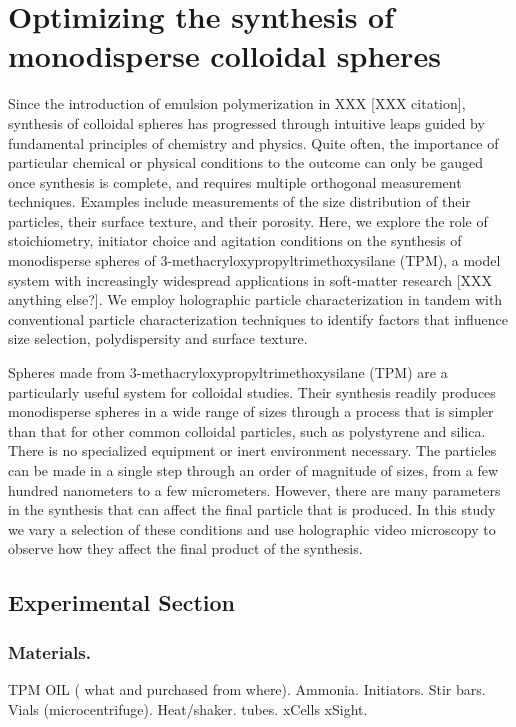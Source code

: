 \chapter{Optimizing the synthesis of monodisperse colloidal spheres}
\label{ch:synthesis}

Since the introduction of emulsion polymerization in XXX [XXX citation], synthesis of colloidal spheres has progressed through
intuitive leaps guided by fundamental principles of chemistry
and physics.  Quite often, the importance of particular chemical
or physical conditions to the outcome can only be gauged once
synthesis is complete, and requires multiple orthogonal measurement
techniques. Examples include measurements of the size distribution
of their particles, their surface texture, and their porosity.
Here, we explore the role of stoichiometry, initiator choice and
agitation conditions on the synthesis of
monodisperse spheres of
\num{3}-methacryloxypropyltrimethoxysilane (TPM),
a model system with increasingly widespread applications
in soft-matter research [XXX anything else?].
We employ holographic particle characterization
in tandem with conventional particle characterization
techniques
to identify factors that 
influence size selection, polydispersity and surface texture.

Spheres made from  \num{3}-methacryloxypropyltrimethoxysilane (TPM) are a 
particularly useful system for colloidal studies. Their synthesis readily 
produces monodisperse spheres in a wide range of sizes through a process 
that is simpler than that for other common colloidal particles, such 
as polystyrene and silica. There is no specialized 
equipment or inert environment necessary. The particles can be made 
in a single step through an order of magnitude of sizes, from a few 
hundred nanometers to a few micrometers. However, there are many 
parameters in the synthesis that can affect the final particle that 
is produced. In this study we vary a selection of these conditions 
and use holographic video microscopy to observe how they affect the 
final product of the synthesis.

\section{Experimental Section}
\subsection{Materials.}
TPM OIL ( what and purchased from where). Ammonia. Initiators. 
Stir bars. Vials (microcentrifuge). Heat/shaker.
tubes. xCells xSight.

